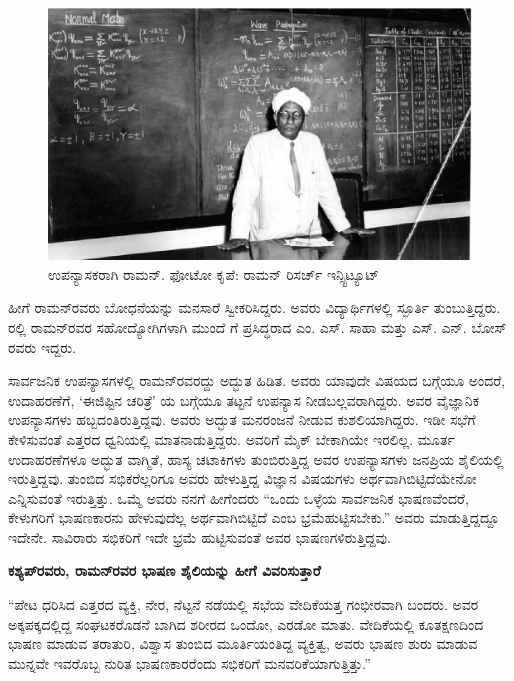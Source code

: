 \begin{figure}[!htbp]
\centering
\includegraphics[scale=0.24]{"images/14.jpg"}
\caption{ಉಪನ್ಯಾಸಕರಾಗಿ ರಾಮನ್. ಫೋಟೋ ಕೃಪೆ: ರಾಮನ್‌ ರಿಸರ್ಚ್ ಇನ್ಸ್ಟಿಟ್ಯೂಟ್}\label{chap4-fig01}
\end{figure}

ಹೀಗೆ ರಾಮನ್‍ರವರು ಬೋಧನೆಯನ್ನು ಮನಸಾರೆ ಸ್ವೀಕರಿಸಿದ್ದರು. ಅವರು ವಿದ್ಯಾರ್ಥಿಗಳಲ್ಲಿ ಸ್ಫೂರ್ತಿ ತುಂಬುತ್ತಿದ್ದರು. ರಲ್ಲಿ ರಾಮನ್‍ರವರ ಸಹೋದ್ಯೋಗಿಗಳಾಗಿ ಮುಂದೆ  ಗೆ ಪ್ರಸಿದ್ಧರಾದ ಎಂ. ಎಸ್. ಸಾಹಾ ಮತ್ತು ಎಸ್. ಎನ್. ಬೋಸ್ ರವರು ಇದ್ದರು.



ಸಾರ್ವಜನಿಕ ಉಪನ್ಯಾಸಗಳಲ್ಲಿ ರಾಮನ್‍ರವರದ್ದು ಅದ್ಭುತ ಹಿಡಿತ. ಅವರು ಯಾವುದೇ ವಿಷಯದ ಬಗ್ಗೆಯೂ ಅಂದರೆ, ಉದಾಹರಣೆಗೆ, ‘ಈಜಿಪ್ಟಿನ ಚರಿತ್ರೆ’ ಯ ಬಗ್ಗೆಯೂ ತಟ್ಟನೆ ಉಪನ್ಯಾಸ ನೀಡಬಲ್ಲವರಾಗಿದ್ದರು. ಅವರ ವೈಜ್ಞಾನಿಕ ಉಪನ್ಯಾಸಗಳು ಹಬ್ಬದಂತಿರುತ್ತಿದ್ದವು. ಅವರು ಅದ್ಭುತ ಮನರಂಜನೆ ನೀಡುವ ಕುಶಲಿಯಾಗಿದ್ದರು. ಇಡೀ ಸಭೆಗೆ ಕೇಳಿಸುವಂತೆ ಎತ್ತರದ ಧ್ವನಿಯಲ್ಲಿ ಮಾತನಾಡುತ್ತಿದ್ದರು. ಅವರಿಗೆ ಮೈಕ್ ಬೇಕಾಗಿಯೇ ಇರಲಿಲ್ಲ. ಮೂರ್ತ ಉದಾಹರಣೆಗಳೂ ಅದ್ಭುತ ವಾಗ್ಮಿತೆ, ಹಾಸ್ಯ ಚಟಾಕಿಗಳು ತುಂಬಿರುತ್ತಿದ್ದ ಅವರ ಉಪನ್ಯಾಸಗಳು ಜನಪ್ರಿಯ ಶೈಲಿಯಲ್ಲಿ ಇರುತ್ತಿದ್ದವು. ತುಂಬಿದ ಸಭಿಕರೆಲ್ಲರಿಗೂ ಅವರು ಹೇಳುತ್ತಿದ್ದ ವಿಜ್ಞಾನ ವಿಷಯಗಳು ಅರ್ಥವಾಗಿ\break ಬಿಟ್ಟಿದೆಯೇನೋ ಎನ್ನಿಸುವಂತೆ ಇರುತ್ತಿತ್ತು. ಒಮ್ಮೆ ಅವರು ನನಗೆ ಹೀಗೆಂದರು “ಒಂದು ಒಳ್ಳೆಯ ಸಾರ್ವಜನಿಕ ಭಾಷಣವೆಂದರೆ, ಕೇಳುಗರಿಗೆ ಭಾಷಣಕಾರನು ಹೇಳುವುದೆಲ್ಲ ಅರ್ಥವಾಗಿಬಿಟ್ಟಿದೆ ಎಂಬ ಭ್ರಮೆಹುಟ್ಟಿಸಬೇಕು.” ಅವರು ಮಾಡುತ್ತಿದ್ದದ್ದೂ ಇದೇನೇ. ಸಾವಿರಾರು ಸಭಿಕರಿಗೆ ಇದೇ ಭ್ರಮೆ ಹುಟ್ಟಿಸುವಂತೆ ಅವರ ಭಾಷಣಗಳಿರುತ್ತಿದ್ದವು.

\vskip 2pt

\textbf{ಕಶ್ಯಪ್‍ರವರು, ರಾಮನ್‍ರವರ ಭಾಷಣ ಶೈಲಿಯನ್ನು ಹೀಗೆ ವಿವರಿಸುತ್ತಾರೆ\general{\enginline{-}}}

\vskip 2pt

“ಪೇಟ ಧರಿಸಿದ ಎತ್ತರದ ವ್ಯಕ್ತಿ, ನೇರ, ನೆಟ್ಟನೆ ನಡೆಯಲ್ಲಿ ಸಭೆಯ ವೇದಿಕೆಯತ್ತ ಗಂಭೀರವಾಗಿ ಬಂದರು. ಅವರ ಅಕ್ಕಪಕ್ಕದಲ್ಲಿದ್ದ ಸಂಘಟಕರೊಡನೆ ಬಾಗಿದ ಶರೀರದ ಒಂದೋ, ಎರಡೋ ಮಾತು. ವೇದಿಕೆಯಲ್ಲಿ ಕೂತಕ್ಷಣದಿಂದ ಭಾಷಣ ಮಾಡುವ ತರಾತುರಿ, ವಿಶ್ವಾಸ ತುಂಬಿದ ಮೂರ್ತಿಯಂತಿದ್ದ ವ್ಯಕ್ತಿತ್ವ, ಅವರು ಭಾಷಣ ಶುರು ಮಾಡುವ ಮುನ್ನವೇ ಇವರೊಬ್ಬ ನುರಿತ ಭಾಷಣಕಾರರೆಂದು ಸಭಿಕರಿಗೆ ಮನವರಿಕೆಯಾಗುತ್ತಿತ್ತು.”

